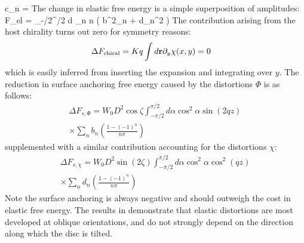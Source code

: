 \beq
c_{n} = 
\eeq
The change in elastic free energy is a simple superposition of amplitudes:
\beq
\Delta F_{el} =   \int_{-\pi/2}^{\pi/2} d \alpha \cos \alpha \sum_{n} n \left ( b^{2}_{n} + d_{n}^{2} \right )
\eeq
The contribution arising from the host chirality turns out zero for symmetry reasons:
\begin{align}
 \Delta F_{\rm chiral} &=  K q \int d {\bf r} \partial_{y} \chi (x,y) =0
\end{align}
which is easily inferred from inserting the expansion  and integrating over $y$.
The reduction in surface anchoring free energy caused by the distortions  $\Phi$ is as follows:
\begin{align}
\Delta F_{s, \Phi} = W_{0}D^{2} \cos \zeta  \int_{-\pi/2}^{\pi/2} d \alpha \cos^{2} \alpha \sin (2 qz) \nonumber \\
\times \sum_{n} b_{n} \left ( \frac{1-(-1)^{n}}{n \pi}\right )
\end{align}
supplemented with a similar contribution accounting for the distortions $\chi$:
\begin{align}
\Delta F_{s, \chi} = W_{0}D^{2} \sin( 2 \zeta ) \int_{-\pi/2}^{\pi/2} d \alpha \cos^{2} \alpha  \cos^{2} (qz) \nonumber \\
\times \sum_{n} d_{n} \left ( \frac{1-(-1)^{n}}{n \pi}\right )
\end{align}
Note the surface anchoring is always negative and should outweigh the cost in elastic free energy. The results in  demonstrate that elastic distortions are most developed at oblique orientations, and do not strongly depend on the direction along which the disc is tilted.

